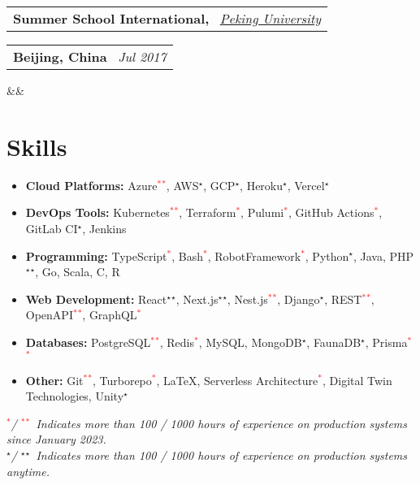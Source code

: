 \documentclass[11pt,a4paper,sans]{moderncv}
\makeatletter
\newcommand*{\customcventry}[7][.13em]{
\begin{tabular}{@{}l}
{\bfseries #4} \
{\itshape #3}
\end{tabular}
\hfill
\begin{tabular}{l@{}}
{\bfseries #5} \
{\itshape #2}
\end{tabular}
\ifx&#7&%
\else{\
\begin{minipage}{\maincolumnwidth}%
\small#7%
\end{minipage}}\fi%
\par\addvspace{#1}}
\newcommand{\inlineLink}[2]{%
    \underline{\href{#1}{#2}}%
}
\makeatother
\begin{document}
{ \customcventry
 {Jul 2017}
 {\color{blue}\href{http://www.oir.pku.edu.cn/summerschool/}{Peking University}}
 {Summer School International,}
 {Beijing, China}
 {}{}
 {
 }
}

\section{Skills}
{
	\newcommand{\skilled}{\textcolor{black}{$^\star$}}
	\newcommand{\sskilled}{\skilled\skilled}
	\newcommand{\skilledRecent}{\textcolor{red}{$^*$}}
	\newcommand{\sskilledRecent}{\skilledRecent\skilledRecent}
			
	\begin{itemize}[label=\textbullet]
		\item {\textbf{Cloud Platforms:} Azure\sskilledRecent, AWS\skilled, GCP\skilled, Heroku\skilled, Vercel\skilled}
		\item {\textbf{DevOps Tools:} Kubernetes\sskilledRecent, Terraform\skilledRecent, Pulumi\skilledRecent, GitHub Actions\skilledRecent, GitLab CI\skilled, Jenkins}
		\item {\textbf{Programming:} TypeScript\skilledRecent, Bash\skilledRecent, RobotFramework\skilledRecent, Python\skilled, Java, PHP\sskilled, Go, Scala, C, R}
		\item {\textbf{Web Development:} React\sskilled, Next.js\sskilled, Nest.js\sskilledRecent, Django\skilled, REST\sskilledRecent, OpenAPI\sskilledRecent, GraphQL\skilledRecent}
		\item {\textbf{Databases:} PostgreSQL\sskilledRecent, Redis\skilledRecent, MySQL, MongoDB\skilled, FaunaDB\skilled, Prisma\sskilledRecent}
		\item {\textbf{Other:} Git\sskilledRecent, Turborepo\skilledRecent, LaTeX, Serverless Architecture\skilledRecent, Digital Twin Technologies, Unity\skilled}
	\end{itemize}
	{\footnotesize%
		\vspace{-2mm}%
		\emph{%
			\hspace*{4mm}\skilledRecent / \sskilledRecent~Indicates more than 100 / 1000 hours of experience on production systems since January 2023.
			} \\
		\emph{%
			\hspace*{4mm}\skilled / \sskilled~Indicates more than 100 / 1000 hours of experience on production systems anytime.}
	}
			        
}
    
\end{document}
